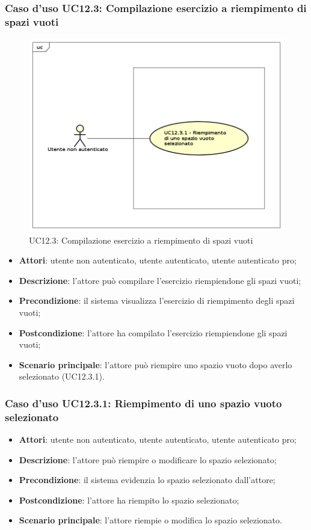 \subsubsection{Caso d'uso UC12.3: Compilazione esercizio a riempimento di spazi vuoti}
\label{UC12.3}
\begin{figure}[h]
	\centering
	\includegraphics[scale=0.5]{UML/UC12_3.png}
	\caption{UC12.3: Compilazione esercizio a riempimento di spazi vuoti}
\end{figure}
\begin{itemize}
\item \textbf{Attori}: utente non autenticato, utente autenticato, utente autenticato pro;
\item \textbf{Descrizione}: l'attore può compilare l'esercizio riempiendone gli spazi vuoti;
\item \textbf{Precondizione}: il sistema visualizza l'esercizio di riempimento degli spazi vuoti;
\item \textbf{Postcondizione}: l'attore ha compilato l'esercizio riempiendone gli spazi vuoti;
\item \textbf{Scenario principale}: l'attore può riempire uno spazio vuoto dopo averlo selezionato (UC12.3.1).
\end{itemize}

\subsubsection{Caso d'uso UC12.3.1: Riempimento di uno spazio vuoto selezionato}
\begin{itemize}
\item \textbf{Attori}: utente non autenticato, utente autenticato, utente autenticato pro;
\item \textbf{Descrizione}: l'attore può riempire o modificare lo spazio selezionato;
\item \textbf{Precondizione}: il sistema evidenzia lo spazio selezionato dall'attore;
\item \textbf{Postcondizione}: l'attore ha riempito lo spazio selezionato;
\item \textbf{Scenario principale}: l'attore riempie o modifica lo spazio selezionato. 
\end{itemize}

